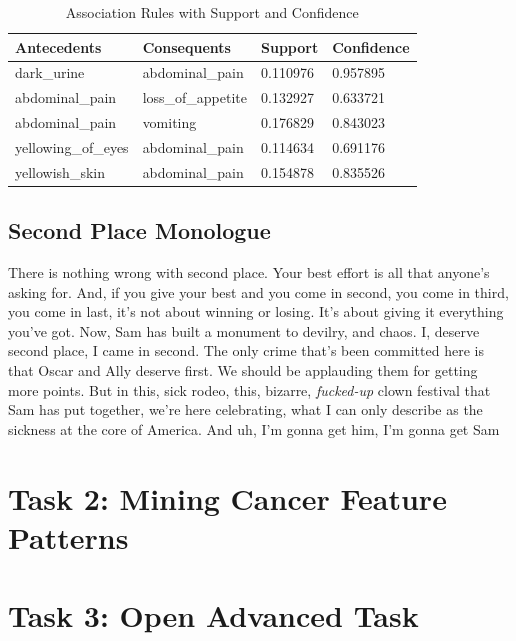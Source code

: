 \documentclass[12pt]{article}
\begin{document}
\begin{table}[ht]
\centering
\begin{tabular}{|l|l|l|l|}
\hline
\textbf{Antecedents}        & \textbf{Consequents}       & \textbf{Support} & \textbf{Confidence} \\ \hline
dark\_urine                 & abdominal\_pain            & 0.110976         & 0.957895           \\ \hline
abdominal\_pain             & loss\_of\_appetite         & 0.132927         & 0.633721           \\ \hline
abdominal\_pain             & vomiting                   & 0.176829         & 0.843023           \\ \hline
yellowing\_of\_eyes         & abdominal\_pain            & 0.114634         & 0.691176           \\ \hline
yellowish\_skin             & abdominal\_pain            & 0.154878         & 0.835526           \\ \hline
\end{tabular}
\caption{Association Rules with Support and Confidence}
\end{table} 

\subsection{Second Place Monologue}
There is nothing wrong with second place. 
Your best effort is all that anyone's asking for. 
And, if you give your best and you come in second, you come in third, you come in last, it's not about winning or losing. 
It's about giving it everything you've got. Now, Sam has built a monument to devilry, and chaos. 
I, deserve second place, I came in second. The only crime that’s been committed here is that Oscar and Ally deserve first. 
We should be applauding them for getting more points. But in this, sick rodeo, this, bizarre, \textit{fucked-up} clown festival that Sam has put together, we’re here celebrating, what I can only describe as the sickness at the core of America. 
And uh, I’m gonna get him, I’m gonna get Sam

\pagebreak
\section{Task 2: Mining Cancer Feature Patterns}

\pagebreak
\section{Task 3: Open Advanced Task}
\end{document}
